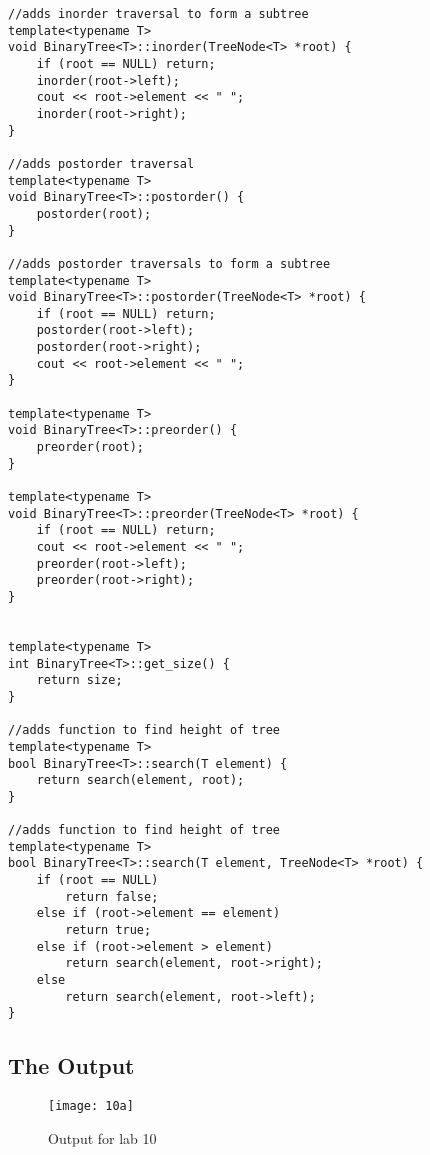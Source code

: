 \documentclass[11pt]{article}
\begin{document}
\begin{lstlisting}
//adds inorder traversal to form a subtree
template<typename T>
void BinaryTree<T>::inorder(TreeNode<T> *root) {
    if (root == NULL) return;
    inorder(root->left);
    cout << root->element << " ";
    inorder(root->right);
}

//adds postorder traversal
template<typename T>
void BinaryTree<T>::postorder() {
    postorder(root);
}

//adds postorder traversals to form a subtree
template<typename T>
void BinaryTree<T>::postorder(TreeNode<T> *root) {
    if (root == NULL) return;
    postorder(root->left);
    postorder(root->right);
    cout << root->element << " ";
}

template<typename T>
void BinaryTree<T>::preorder() {
    preorder(root);
}

template<typename T>
void BinaryTree<T>::preorder(TreeNode<T> *root) {
    if (root == NULL) return;
    cout << root->element << " ";
    preorder(root->left);
    preorder(root->right);
}


template<typename T>
int BinaryTree<T>::get_size() {
    return size;
}

//adds function to find height of tree
template<typename T>
bool BinaryTree<T>::search(T element) {
    return search(element, root);
}

//adds function to find height of tree
template<typename T>
bool BinaryTree<T>::search(T element, TreeNode<T> *root) {
    if (root == NULL)
        return false;
    else if (root->element == element)
        return true;
    else if (root->element > element)
        return search(element, root->right);
    else
        return search(element, root->left);
}

\end{lstlisting}



\subsection*{The Output}

\begin{figure}[h]
    \centering
    \texttt{[image: 10a]}
    \caption{Output for lab 10}
\end{figure}
\end{document}
